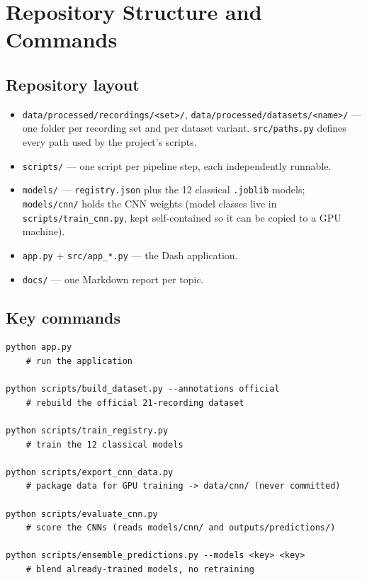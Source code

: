 \chapter{Repository Structure and Commands}
\label{chap:appendix}

\section{Repository layout}

\begin{itemize}[leftmargin=1.4em]
  \item \texttt{data/processed/recordings/<set>/}, \texttt{data/processed/datasets/<name>/} ---
    one folder per recording set and per dataset variant. \texttt{src/paths.py} defines every
    path used by the project's scripts.
  \item \texttt{scripts/} --- one script per pipeline step, each independently runnable.
  \item \texttt{models/} --- \texttt{registry.json} plus the 12 classical \texttt{.joblib}
    models; \texttt{models/cnn/} holds the CNN weights (model classes live in
    \texttt{scripts/train\_cnn.py}, kept self-contained so it can be copied to a GPU machine).
  \item \texttt{app.py} + \texttt{src/app\_*.py} --- the Dash application.
  \item \texttt{docs/} --- one Markdown report per topic.
\end{itemize}

\section{Key commands}

\begin{verbatim}
python app.py
    # run the application

python scripts/build_dataset.py --annotations official
    # rebuild the official 21-recording dataset

python scripts/train_registry.py
    # train the 12 classical models

python scripts/export_cnn_data.py
    # package data for GPU training -> data/cnn/ (never committed)

python scripts/evaluate_cnn.py
    # score the CNNs (reads models/cnn/ and outputs/predictions/)

python scripts/ensemble_predictions.py --models <key> <key>
    # blend already-trained models, no retraining
\end{verbatim}


